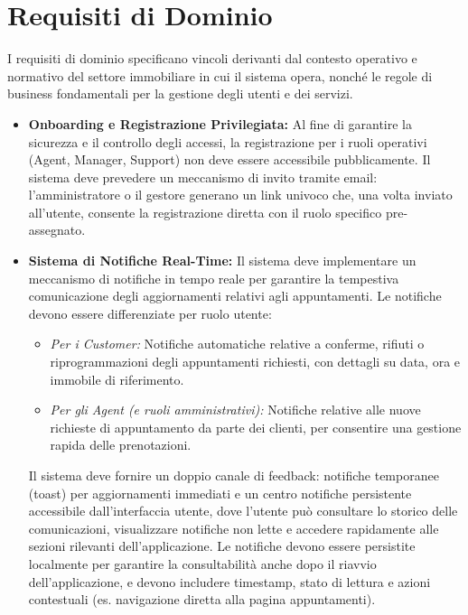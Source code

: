 \section{Requisiti di Dominio}

I requisiti di dominio specificano vincoli derivanti dal contesto operativo e normativo del settore 
immobiliare in cui il sistema opera, nonché le regole di business fondamentali per la gestione degli 
utenti e dei servizi.

\begin{itemize}
    \item \textbf{Onboarding e Registrazione Privilegiata:} Al fine di garantire la sicurezza e il 
    controllo degli accessi, la registrazione per i ruoli operativi (Agent, Manager, Support) non deve 
    essere accessibile pubblicamente. Il sistema deve prevedere un meccanismo di invito tramite email: 
    l'amministratore o il gestore generano un link univoco che, una volta inviato all'utente, consente 
    la registrazione diretta con il ruolo specifico pre-assegnato.

    \item \textbf{Sistema di Notifiche Real-Time:} Il sistema deve implementare un meccanismo di notifiche 
    in tempo reale per garantire la tempestiva comunicazione degli aggiornamenti relativi agli appuntamenti. 
    Le notifiche devono essere differenziate per ruolo utente:
    \begin{itemize}
        \item \textit{Per i Customer:} Notifiche automatiche relative a conferme, rifiuti o riprogrammazioni 
        degli appuntamenti richiesti, con dettagli su data, ora e immobile di riferimento.
        \item \textit{Per gli Agent (e ruoli amministrativi):} Notifiche relative alle nuove richieste di 
        appuntamento da parte dei clienti, per consentire una gestione rapida delle prenotazioni.
    \end{itemize}
    Il sistema deve fornire un doppio canale di feedback: notifiche temporanee (toast) per aggiornamenti 
    immediati e un centro notifiche persistente accessibile dall'interfaccia utente, dove l'utente può 
    consultare lo storico delle comunicazioni, visualizzare notifiche non lette e accedere rapidamente 
    alle sezioni rilevanti dell'applicazione. Le notifiche devono essere persistite localmente per 
    garantire la consultabilità anche dopo il riavvio dell'applicazione, e devono includere timestamp, 
    stato di lettura e azioni contestuali (es. navigazione diretta alla pagina appuntamenti).


\end{itemize}

